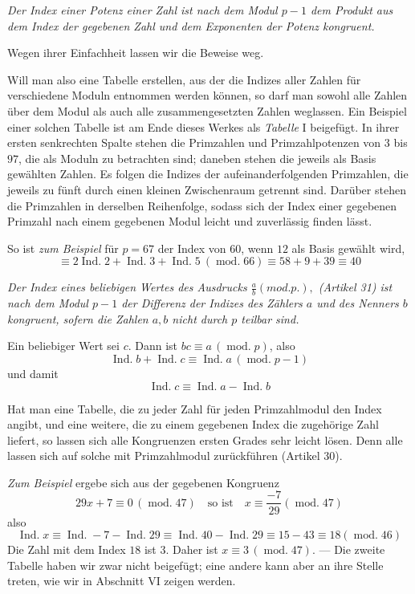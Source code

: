 \emph{Der Index einer Potenz einer Zahl ist nach dem Modul $p-1$ dem Produkt aus dem Index der gegebenen Zahl und dem Exponenten der Potenz kongruent.}

Wegen ihrer Einfachheit lassen wir die Beweise weg.

Will man also eine Tabelle erstellen, aus der die Indizes aller Zahlen für verschiedene Moduln entnommen werden können, so darf man sowohl alle Zahlen über dem Modul als auch alle zusammengesetzten Zahlen weglassen. Ein Beispiel einer solchen Tabelle ist am Ende dieses Werkes als \emph{Tabelle} I beigefügt. In ihrer ersten senkrechten Spalte stehen die Primzahlen und Primzahlpotenzen von $3$ bis $97$, die als Moduln zu betrachten sind; daneben stehen die jeweils als Basis gewählten Zahlen. Es folgen die Indizes der aufeinanderfolgenden Primzahlen, die jeweils zu fünft durch einen kleinen
Zwischenraum getrennt sind. Darüber stehen die Primzahlen in derselben Reihenfolge, sodass sich der Index einer gegebenen Primzahl nach einem gegebenen Modul leicht und zuverlässig finden lässt.

So ist \emph{zum Beispiel} für $p=67$ der Index von $60$, wenn $12$ als Basis gewählt wird,
\[\equiv2\operatorname{Ind.}2+\operatorname{Ind.}3+\operatorname{Ind.}5\ (\operatorname{mod.}66)\equiv58+9+39\equiv40\]

\emph{Der Index eines beliebigen Wertes des Ausdrucks $\frac{a}{b}(\mathit{mod.}p.),$ (Artikel 31) ist nach dem Modul $p-1$ der Differenz der Indizes des Zählers $a$ und des Nenners $b$ kongruent, sofern die Zahlen $a,b$ nicht durch $p$ teilbar sind.}

Ein beliebiger Wert sei $c$. Dann ist $bc\equiv a\,(\operatorname{mod.}p)$, also
\[\operatorname{Ind.}b+\operatorname{Ind.}c\equiv\operatorname{Ind.}a\,(\operatorname{mod.}p-1)\]
und damit
\[\operatorname{Ind.}c\equiv\operatorname{Ind.}a-\operatorname{Ind.}b\]

Hat man eine Tabelle, die zu jeder Zahl für jeden Primzahlmodul den Index angibt, und eine weitere, die zu einem gegebenen Index die zugehörige Zahl liefert, so lassen sich alle Kongruenzen ersten Grades sehr leicht lösen. Denn alle lassen sich auf solche mit Primzahlmodul zurückführen (Artikel 30).

\emph{Zum Beispiel} ergebe sich aus der gegebenen Kongruenz
\[29x+7\equiv0\,(\operatorname{mod.}47)\quad\text{so ist}\quad x\equiv\frac{-7}{29}(\operatorname{mod.}47)\]
also
\[\operatorname{Ind.}x\equiv\operatorname{Ind.}-7-\operatorname{Ind.}29\equiv\operatorname{Ind.}40-\operatorname{Ind.}29\equiv15-43\equiv18(\operatorname{mod.}46)\]
Die Zahl mit dem Index $18$ ist $3$. Daher ist $x\equiv3\,(\operatorname{mod.}47)$. --- Die zweite Tabelle haben wir zwar nicht beigefügt; eine andere kann aber an ihre Stelle treten, wie wir in Abschnitt VI zeigen werden.

